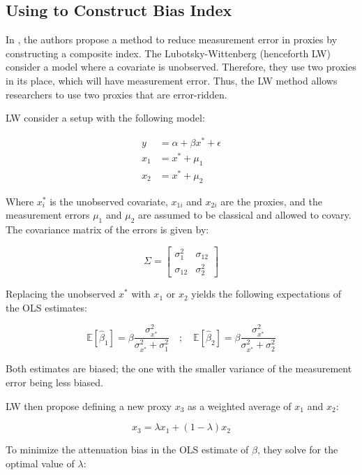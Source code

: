 \subsection{Using \textcite{lubotskyInterpretationRegressionsMultiple2006} to Construct Bias Index} %
\label{sub:lw-bias}
In \textcite{lubotskyInterpretationRegressionsMultiple2006}, the authors propose a method to reduce measurement error in proxies by constructing a composite index. The Lubotsky-Wittenberg (henceforth LW) consider a model where a covariate is unobserved. Therefore, they use two proxies in its place, which will have measurement error. Thus, the LW method allows researchers to use two proxies that are error-ridden. 

LW consider a setup with the following model:

\begin{align*}
    y &= \alpha + \beta x^* + \epsilon \\
    x_1 &= x^* + \mu_1 \\
    x_2 &= x^* + \mu_2
\end{align*}

Where \(x_{i}^{*}\) is the unobserved covariate, \(x_{1i}\) and \(x_{2i}\) are the proxies, and the measurement errors \(\mu_1\) and \(\mu_2\) are assumed to be classical and allowed to covary. The covariance matrix of the errors is given by:

\[
\Sigma = \begin{bmatrix}
    \sigma_1^2 & \sigma_{12} \\
    \sigma_{12} & \sigma_2^2
\end{bmatrix}
\]

Replacing the unobserved \(x^*\) with \(x_1\) or \(x_2\) yields the following expectations of the OLS estimates:

\[
\mathbb{E} \left[ \hat{\beta}_1 \right] = \beta \frac{\sigma_{x^*}^2}{\sigma_{x^*}^2 + \sigma_1^2} \quad ; \quad \mathbb{E} \left[ \hat{\beta}_2 \right] = \beta \frac{\sigma_{x^*}^2}{\sigma_{x^*}^2 + \sigma_2^2}
\]

Both estimates are biased; the one with the smaller variance of the measurement error being less biased.

LW then propose defining a new proxy \(x_3\) as a weighted average of \(x_1\) and \(x_2\):

\[
x_3 = \lambda x_1 + (1 - \lambda) x_2
\]

To minimize the attenuation bias in the OLS estimate of \(\beta\), they solve for the optimal value of \(\lambda\):

